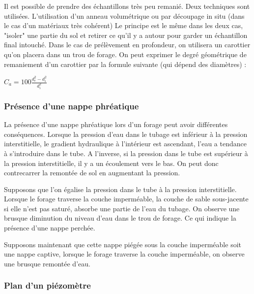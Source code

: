         Il est possible de prendre des échantillons très peu remanié. Deux techniques sont utilisées. L'utilisation d'un anneau volumétrique ou par découpage in situ (dans le cas d'un matériaux très cohérent) Le principe est le même dans les deux cas, "isoler" une partie du sol et retirer ce qu'il y a autour pour garder un échantillon final intouché. Dans le cas de prélèvement en profondeur, on utilisera un carottier qu'on placera dans un trou de forage. On peut exprimer le degré géométrique de remaniement d'un carottier par la formule suivante (qui dépend des diamètres) : 
            
        \begin{center}
                $C_a = 100 \frac{d^2_e - d^2_i}{d^2_i}$
        \end{center} 
            
        \subsubsection{Présence d'une nappe phréatique}
            
            La présence d'une nappe phréatique lors d'un forage peut avoir différentes conséquences. Lorsque la pression d'eau dans le tubage est inférieur à la pression interstitielle, le gradient hydraulique à l'intérieur est ascendant, l'eau a tendance à s'introduire dans le tube. A l'inverse, si la pression dans le tube est supérieur à la pression interstitielle, il y a un écoulement vers le bas. On peut donc contrecarrer la remontée de sol en augmentant la pression.
            
            Supposons que l'on égalise la pression dans le tube à la pression interstitielle. Lorsque le forage traverse la couche imperméable, la couche de sable sous-jacente si elle n'est pas saturé, absorbe une partie de l'eau du tubage. On observe une brusque diminution du niveau d'eau dans le trou de forage. Ce qui  indique la présence d'une nappe perchée. 
            
            Supposons maintenant que cette nappe piégée sous la couche imperméable soit une nappe captive, lorsque le forage traverse la couche imperméable, on observe une brusque remontée d'eau.
            
        \subsubsection{Plan d'un piézomètre}
            
